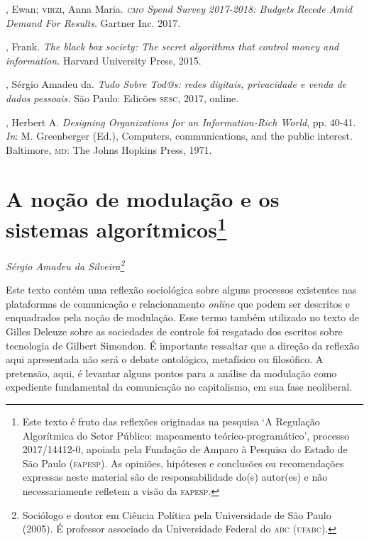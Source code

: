 \begin{bibliohedra}
, Ewan; \textsc{virzi}, Anna Maria. \emph{\textsc{cmo} Spend Survey 2017-2018:
Budgets Recede Amid Demand For Results}. Gartner Inc. 2017.

, Frank. \emph{The black box society: The secret algorithms
that control money and information.} Harvard University Press, 2015.

, Sérgio Amadeu da. \emph{Tudo Sobre Tod@s: redes digitais,
privacidade e venda de dados pessoais.} São Paulo: Edicões \textsc{sesc}, 2017,
online.

, Herbert A. \emph{Designing Organizations for an
Information-Rich World}, pp. 40-41. \emph{In}: M. Greenberger (Ed.), Computers,
communications, and the public interest. Baltimore, \textsc{md}: The Johns
Hopkins Press, 1971.

\end{bibliohedra}


\chapter*{A noção de modulação e os sistemas algorítmicos\footnote{Este texto é fruto das reflexões originadas na pesquisa `A Regulação Algorítmica do Setor Público: mapeamento teórico-programático', processo 2017/14412-0, apoiada pela Fundação de Amparo à Pesquisa do Estado de São Paulo (\textsc{fapesp}). As opiniões, hipóteses e conclusões ou recomendações expressas neste material são de responsabilidade do(s) autor(es) e não necessariamente refletem a visão da \textsc{fapesp}.}}


\begin{flushright}
\emph{Sérgio Amadeu da Silveira\footnote{Sociólogo e doutor em Ciência Política pela Universidade de São Paulo (2005). É professor associado da Universidade Federal do \textsc{abc} (\textsc{ufabc}).}}
\end{flushright}

\noindent{}Este texto contém uma reflexão sociológica sobre alguns processos
existentes nas plataformas de comunicação e relacionamento \emph{online} que
podem ser descritos e enquadrados pela noção de modulação. Esse termo
também utilizado no texto de Gilles Deleuze sobre as sociedades de
controle foi resgatado dos escritos sobre tecnologia de Gilbert
Simondon. É importante ressaltar que a direção da reflexão aqui
apresentada não será o debate ontológico, metafísico ou filosófico. A
pretensão, aqui, é levantar alguns pontos para a análise da modulação
como expediente fundamental da comunicação no capitalismo, em sua fase
neoliberal.

